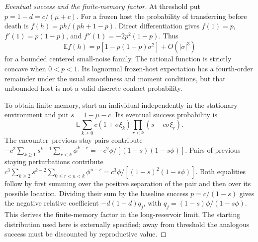 \begin{proof}[Eventual success and the finite-memory factor]
At threshold put \(p=1-d=c/(\mu+c)\). For a frozen host the probability of transferring before death is \(f(h)=ph/(ph+1-p)\). Direct differentiation gives \(f(1)=p\), \(f'(1)=p(1-p)\), and \(f''(1)=-2p^2(1-p)\). Thus
\[
 \mathbb Ef(h)=p[1-p(1-p)\sigma^2]+O(|\sigma|^3)
\]
for a bounded centered small-noise family. The rational function is strictly concave when \(0<p<1\). Its lognormal frozen-host expectation has a fourth-order remainder under the usual smoothness and moment conditions, but that unbounded host is not a valid discrete contact probability.

To obtain finite memory, start an individual independently in the stationary environment and put \(s=1-\mu-c\). Its eventual success probability is
\[
 \mathbb E\sum_{k\geq0}c(1+\sigma\xi_k)\prod_{r<k}(s-c\sigma\xi_r).
\]
The encounter--previous-stay pairs contribute
\(-c^2\sum_{k\geq1}s^{k-1}\sum_{r<k}\phi^{k-r}
=-c^2\phi/[(1-s)(1-s\phi)]\).
Pairs of previous staying perturbations contribute
\(c^3\sum_{k\geq2}s^{k-2}\sum_{0\leq r<u<k}\phi^{u-r}
=c^3\phi/[(1-s)^2(1-s\phi)]\).
Both equalities follow by first summing over the positive separation of the pair and then over its possible location. Dividing their sum by the baseline success \(p=c/(1-s)\) gives the negative relative coefficient \(-d(1-d)q_j\), with \(q_j=(1-s)\phi/(1-s\phi)\). This derives the finite-memory factor in the long-reservoir limit. The starting distribution used here is externally specified; away from threshold the analogous success must be discounted by reproductive value.
\end{proof}

